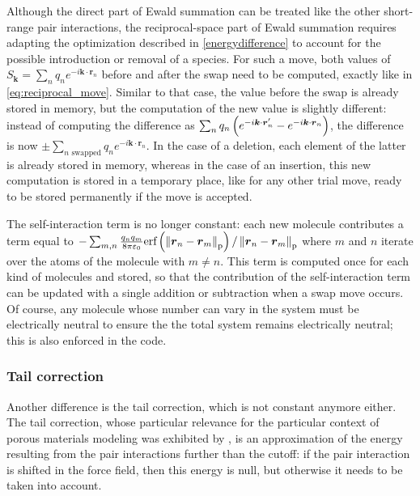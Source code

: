 \documentclass[main.tex]{subfiles}
\begin{document}
Although the direct part of Ewald summation can be treated like the other short-range pair interactions, the reciprocal-space part of Ewald summation requires adapting the optimization described in \cref{energydifference} to account for the possible introduction or removal of a species. For such a move, both values of $S_{\boldsymbol k} = \sum_n q_ne^{-i\boldsymbol k\cdot\boldsymbol r_n}$ before and after the swap need to be computed, exactly like in \cref{eq:reciprocal_move}. Similar to that case, the value before the swap is already stored in memory, but the computation of the new value is slightly different: instead of computing the difference as $\sum_n q_n\left(e^{-i\boldsymbol k\cdot\boldsymbol r'_n} - e^{-i\boldsymbol k\cdot\boldsymbol r_n}\right)$, the difference is now $\pm\sum_{n\text{ swapped}} q_n e^{-i\boldsymbol k\cdot\boldsymbol r_n}$. In the case of a deletion, each element of the latter is already stored in memory, whereas in the case of an insertion, this new computation is stored in a temporary place, like for any other trial move, ready to be stored permanently if the move is accepted.

The self-interaction term is no longer constant: each new molecule contributes a term equal to $-\sum_{m,n}\frac{q_n q_m}{8\pi\varepsilon_0}\text{erf}\left(\left\|\boldsymbol r_n - \boldsymbol r_m\right\|_\text{p}\right)/\left\|\boldsymbol r_n - \boldsymbol r_m\right\|_\text{p}$ where $m$ and $n$ iterate over the atoms of the molecule with $m\neq n$. This term is computed once for each kind of molecules and stored, so that the contribution of the self-interaction term can be updated with a single addition or subtraction when a swap move occurs. Of course, any molecule whose number can vary in the system must be electrically neutral to ensure the the total system remains electrically neutral; this is also enforced in the code.

\subsubsection{Tail correction}

\label{tailcorrection}

Another difference is the tail correction, which is not constant anymore either. The tail correction, whose particular relevance for the particular context of porous materials modeling was exhibited by \textcite{TailCorrection}, is an approximation of the energy resulting from the pair interactions further than the cutoff: if the pair interaction is shifted in the force field, then this energy is null, but otherwise it needs to be taken into account.
\end{document}
